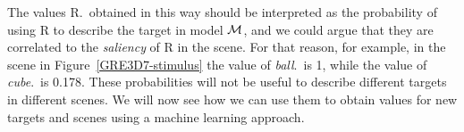 %
%
%
%
The values R.\puse\ obtained in this way should be interpreted as the probability of using R to describe the target in model $\mathcal{M}$, and we could argue that they are correlated to the \emph{saliency} of R in the scene.  
For that reason, for example, in the scene in Figure~\ref{GRE3D7-stimulus} the value of \emph{ball}.\puse\ is 1, while the value of \emph{cube}.\puse\ is 0.178.  These probabilities will not be useful to describe different targets in different scenes.  We will now see how we can use them to obtain values for new targets and scenes using a machine learning approach. 




